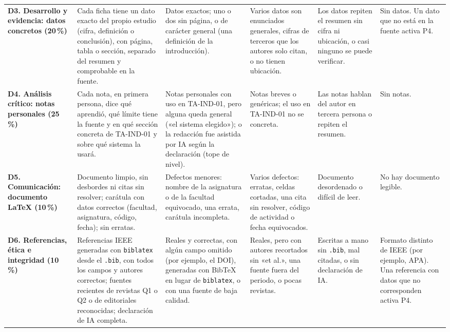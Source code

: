 \documentclass[11pt,a4paper]{article}
\begin{document}
\begin{landscape}
\begin{xltabular}{\linewidth}{@{}L{3.2cm}YYYYL{2.7cm}@{}}
	\addlinespace
	\textbf{D3. Desarrollo y evidencia: datos concretos (20\,\%)} & Cada ficha tiene un dato exacto del propio estudio (cifra, definición o conclusión), con página, tabla o sección, separado del resumen y comprobable en la fuente. & Datos exactos; uno o dos sin página, o de carácter general (una definición de la introducción). & Varios datos son enunciados generales, cifras de terceros que los autores solo citan, o no tienen ubicación. & Los datos repiten el resumen sin cifra ni ubicación, o casi ninguno se puede verificar. & Sin datos. Un dato que no está en la fuente activa P4. \\
	\addlinespace
	\textbf{D4. Análisis crítico: notas personales (25\,\%)} & Cada nota, en primera persona, dice qué aprendió, qué límite tiene la fuente y en qué sección concreta de TA-IND-01 y sobre qué sistema la usará. & Notas personales con uso en TA-IND-01, pero alguna queda general («el sistema elegido»); o la redacción fue asistida por IA según la declaración (tope de nivel). & Notas breves o genéricas; el uso en TA-IND-01 no se concreta. & Las notas hablan del autor en tercera persona o repiten el resumen. & Sin notas. \\
	\addlinespace
	\textbf{D5. Comunicación: documento \LaTeX{} (10\,\%)} & Documento limpio, sin desbordes ni citas sin resolver; carátula con datos correctos (facultad, asignatura, código, fecha); sin erratas. & Defectos menores: nombre de la asignatura o de la facultad equivocado, una errata, carátula incompleta. & Varios defectos: erratas, celdas cortadas, una cita sin resolver, código de actividad o fecha equivocados. & Documento desordenado o difícil de leer. & No hay documento legible. \\
	\addlinespace
	\textbf{D6. Referencias, ética e integridad (10\,\%)} & Referencias IEEE generadas con \texttt{biblatex} desde el \texttt{.bib}, con todos los campos y autores correctos; fuentes recientes de revistas Q1 o Q2 o de editoriales reconocidas; declaración de IA completa. & Reales y correctas, con algún campo omitido (por ejemplo, el DOI), generadas con BibTeX en lugar de \texttt{biblatex}, o con una fuente de baja calidad. & Reales, pero con autores recortados sin «et al.», una fuente fuera del periodo, o pocas revistas. & Escritas a mano sin \texttt{.bib}, mal citadas, o sin declaración de IA. & Formato distinto de IEEE (por ejemplo, APA). Una referencia con datos que no corresponden activa P4. \\
	\bottomrule
\end{xltabular}
\end{landscape}
\end{document}
